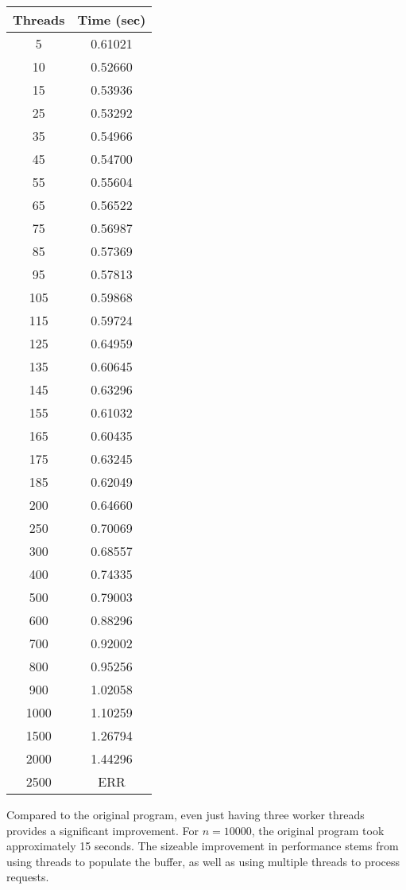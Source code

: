 \documentclass[10pt]{article}
\begin{document}
\begin{table}[h]
\begin{tabular}{c|c}
\textbf{Threads} & \textbf{Time (sec)} \\ \hline
5 & 0.61021 \\
10 & 0.52660 \\
15 & 0.53936 \\
25 & 0.53292 \\
35 & 0.54966 \\
45 & 0.54700 \\
55 & 0.55604 \\
65 & 0.56522 \\
75 & 0.56987 \\
85 & 0.57369 \\
95 & 0.57813 \\
105 & 0.59868 \\
115 & 0.59724 \\
125 & 0.64959 \\
135 & 0.60645 \\
145 & 0.63296 \\
155 & 0.61032 \\
165 & 0.60435 \\
175 & 0.63245 \\
185 & 0.62049 \\
200 & 0.64660 \\
250 & 0.70069 \\
300 & 0.68557 \\
400 & 0.74335 \\
500 & 0.79003 \\
600 & 0.88296 \\
700 & 0.92002 \\
800 & 0.95256 \\
900 & 1.02058 \\
1000 & 1.10259 \\
1500 & 1.26794 \\
2000 & 1.44296 \\
2500 & ERR
\end{tabular}
\end{table}

Compared to the original program, even just having three worker threads provides a significant improvement. For $n = 10000$, the original program took approximately 15 seconds. The sizeable improvement in performance stems from using threads to populate the buffer, as well as using multiple threads to process requests.
\end{document}
